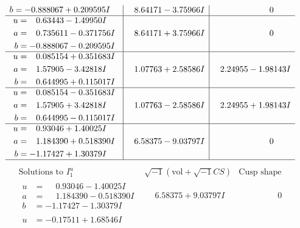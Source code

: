 \documentclass[1p]{elsarticle_modified}
\theoremstyle{definition}
\newcommand{\I}{\sqrt{-1}}
\begin{document}
$$\begin{array}{c|c|c}
\begin{aligned}
b &= -0.888067 + 0.209595 I\end{aligned}
 & \phantom{-}8.64171 - 3.75966 I & \phantom{-0.000000 } 0 \\ \hline\begin{aligned}
u &= \phantom{-}0.63443 - 1.49950 I \\
a &= \phantom{-}0.735611 - 0.371756 I \\
b &= -0.888067 - 0.209595 I\end{aligned}
 & \phantom{-}8.64171 + 3.75966 I & \phantom{-0.000000 } 0 \\ \hline\begin{aligned}
u &= \phantom{-}0.085154 + 0.351683 I \\
a &= \phantom{-}1.57905 - 3.42818 I \\
b &= \phantom{-}0.644995 + 0.115017 I\end{aligned}
 & \phantom{-}1.07763 + 2.58586 I & \phantom{-}2.24955 - 1.98143 I \\ \hline\begin{aligned}
u &= \phantom{-}0.085154 - 0.351683 I \\
a &= \phantom{-}1.57905 + 3.42818 I \\
b &= \phantom{-}0.644995 - 0.115017 I\end{aligned}
 & \phantom{-}1.07763 - 2.58586 I & \phantom{-}2.24955 + 1.98143 I \\ \hline\begin{aligned}
u &= \phantom{-}0.93046 + 1.40025 I \\
a &= \phantom{-}1.184390 + 0.518390 I \\
b &= -1.17427 + 1.30379 I\end{aligned}
 & \phantom{-}6.58375 - 9.03797 I & \phantom{-0.000000 } 0\\
 \hline 
 \end{array}$$\newpage$$\begin{array}{c|c|c}  
\text{Solutions to }I^u_{1}& \I (\text{vol} + \sqrt{-1}CS) & \text{Cusp shape}\\
 \hline 
\begin{aligned}
u &= \phantom{-}0.93046 - 1.40025 I \\
a &= \phantom{-}1.184390 - 0.518390 I \\
b &= -1.17427 - 1.30379 I\end{aligned}
 & \phantom{-}6.58375 + 9.03797 I & \phantom{-0.000000 } 0 \\ \hline\begin{aligned}
u &= -0.17511 + 1.68546 I \\

\end{aligned}
\end{array}$$
\end{document}
